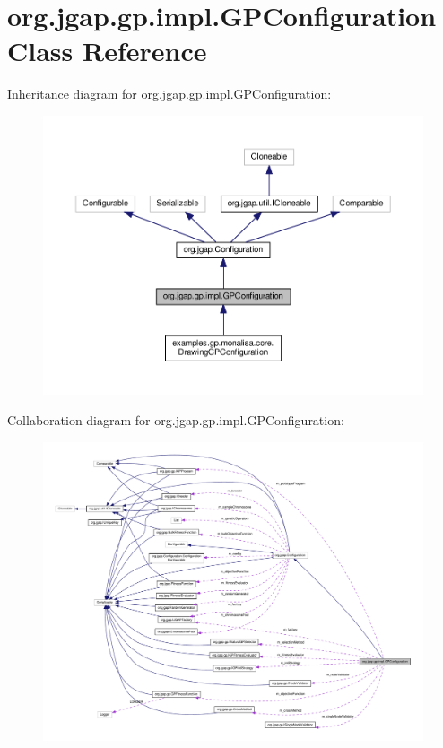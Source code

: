 \hypertarget{classorg_1_1jgap_1_1gp_1_1impl_1_1_g_p_configuration}{\section{org.\-jgap.\-gp.\-impl.\-G\-P\-Configuration Class Reference}
\label{classorg_1_1jgap_1_1gp_1_1impl_1_1_g_p_configuration}
}


Inheritance diagram for org.\-jgap.\-gp.\-impl.\-G\-P\-Configuration\-:
\nopagebreak
\begin{figure}[H]
\begin{center}
\leavevmode
\includegraphics[width=350pt]{classorg_1_1jgap_1_1gp_1_1impl_1_1_g_p_configuration__inherit__graph}
\end{center}
\end{figure}


Collaboration diagram for org.\-jgap.\-gp.\-impl.\-G\-P\-Configuration\-:
\nopagebreak
\begin{figure}[H]
\begin{center}
\leavevmode
\includegraphics[width=350pt]{classorg_1_1jgap_1_1gp_1_1impl_1_1_g_p_configuration__coll__graph}
\end{center}
\end{figure}
